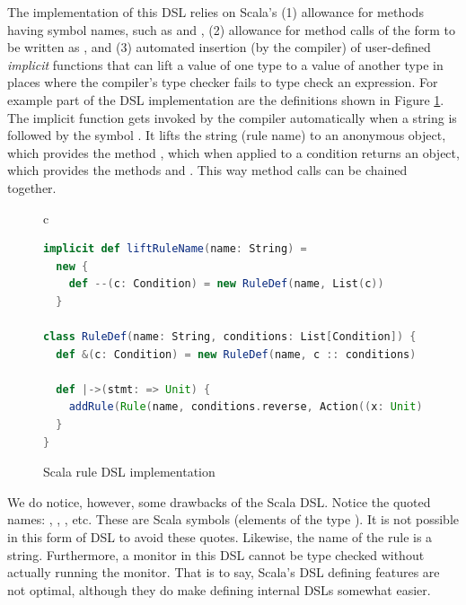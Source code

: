 The implementation of this DSL relies on Scala's (1) 
allowance for methods having symbol names, such as \iscala{--}
and \iscala{|->}, (2) allowance for method calls of the form 
 to be written as 
, and (3) automated insertion (by 
the compiler) of 
user-defined {\em implicit} 
functions that can lift a value of one type 
to a value of another type in places where the compiler's type 
checker fails to type check an expression. For example part of
the DSL implementation are the definitions shown in Figure
\ref{fig:dsl-scala}.
The implicit function  
gets invoked by the compiler automatically when a string is 
followed by the symbol \iscala{--}. It lifts the string (rule name) to an anonymous object, which provides the method \iscala{--}, which when applied to a condition returns
an  object, which provides the methods \iscala{&}
and \iscala{|->}. This way method calls can be chained together.

\begin{figure}
\begin{center}
\begin{tabular}{c}
\begin{lstlisting}[language=scala]
implicit def liftRuleName(name: String) = 
  new { 
    def --(c: Condition) = new RuleDef(name, List(c)) 
  }

class RuleDef(name: String, conditions: List[Condition]) { 
  def &(c: Condition) = new RuleDef(name, c :: conditions)

  def |->(stmt: => Unit) { 
    addRule(Rule(name, conditions.reverse, Action((x: Unit) => stmt))) 
  } 
}
\end{lstlisting}
\end{tabular}
\end{center}
\caption{Scala rule DSL implementation}
\label{fig:dsl-scala}
\end{figure}

We do notice, however, some drawbacks of the Scala DSL.
Notice the quoted names: , , 
, etc. These are Scala symbols (elements of the type 
). It is not possible in this form of DSL to avoid 
these quotes. Likewise, the name of the rule is a string. 
Furthermore, a monitor in this DSL cannot be type checked without 
actually running the monitor. That is to say, Scala's DSL defining
features are not optimal, although they do make defining internal 
DSLs somewhat easier.
